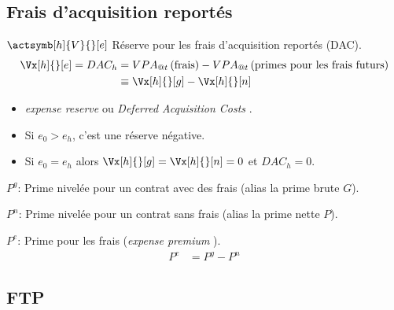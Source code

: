 \documentclass[10pt, french]{article}
\begin{document}
\begin{multicols*}{2}
\subsection{Frais d'acquisition reportés}

\begin{description}
	\item	$\actsymb[h]{V}{}[e]$	Réserve pour les frais d'acquisition reportés (DAC).
		\begin{align*}
		\Vx[h]{}[e] =	DAC_{h}
		&=	VPA_{@t}\left(\shortstack{frais}\right) - VPA_{@t}\left(\shortstack{primes pour les frais futurs}\right)	\\
		&\equiv	\Vx[h]{}[g] - \Vx[h]{}[n]		
		\end{align*}
		\begin{itemize}[leftmargin = *]
		\item	\og \textit{expense reserve} \fg{} ou \og \textit{Deferred Acquisition Costs} \fg{}.
		\item	Si $e_{0} > e_{h}$, c'est une réserve négative.
		\item	Si $e_{0} = e_{h}$ alors $\Vx[h]{}[g] = \Vx[h]{}[n] = 0$ et $DAC_{h} = 0$.
		\end{itemize}
	\item	$P^{g}$:	Prime nivelée pour un contrat avec des frais (alias la prime brute $G$).
	\item	$P^{n}$:	Prime nivelée pour un contrat sans frais (alias la prime nette $P$).
	\item	$P^{e}$:	Prime pour les frais (\og \textit{expense premium} \fg{}).
		\begin{align*}
		P^{e}
		&=	P^{g} - P^{n}
		\end{align*}
\end{description}

\subsection{FTP}


\end{multicols*}
\end{document}
